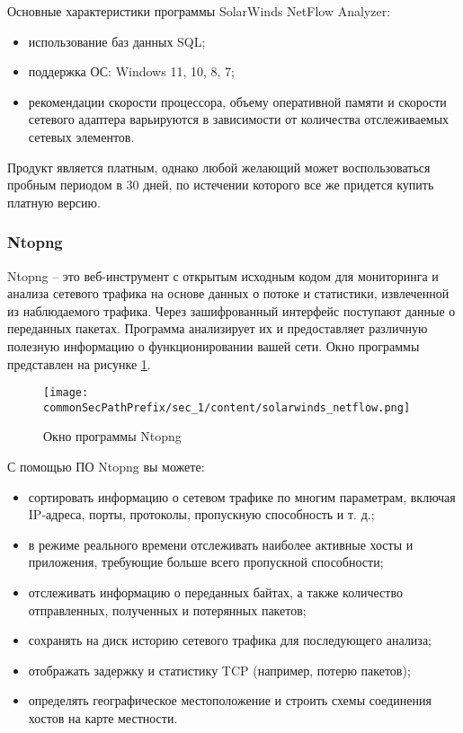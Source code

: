 Основные характеристики программы SolarWinds NetFlow Analyzer:
\begin{itemize}
    \item использование баз данных SQL;
    \item поддержка ОС: Windows 11, 10, 8, 7;
    \item рекомендации скорости процессора, объему оперативной памяти и
    скорости сетевого адаптера варьируются в зависимости от количества
    отслеживаемых сетевых элементов.
\end{itemize}

Продукт является платным, однако любой желающий может воспользоваться пробным 
периодом в 30 дней, по истечении которого все же придется купить платную версию.


\subsubsection{Ntopng}

Ntopng -- это веб-инструмент с открытым исходным кодом для
мониторинга и анализа сетевого трафика на основе данных о потоке и
статистики, извлеченной из наблюдаемого трафика. Через зашифрованный
интерфейс поступают данные о переданных пакетах. Программа анализирует их
и предоставляет различную полезную информацию о функционировании вашей
сети. Окно программы представлен на рисунке \ref{fig:colasoft}.

\begin{figure}[h!]
    \centering
    \texttt{[image: \\commonSecPathPrefix/sec\_1/content/solarwinds\_netflow.png]}
    \caption{Окно программы Ntopng}
    \label{fig:colasoft}
\end{figure}

С помощью ПО Ntopng вы можете:
\begin{itemize}
    \item сортировать информацию о сетевом трафике по многим параметрам,
    включая IP-адреса, порты, протоколы, пропускную способность и т. д.;
    \item в режиме реального времени отслеживать наиболее активные хосты и
    приложения, требующие больше всего пропускной способности;
    \item отслеживать информацию о переданных байтах, а также количество
    отправленных, полученных и потерянных пакетов;
    \item сохранять на диск историю сетевого трафика для последующего анализа;
    \item отображать задержку и статистику TCP (например, потерю пакетов);
    \item определять географическое местоположение и строить схемы соединения
    хостов на карте местности.
\end{itemize}


